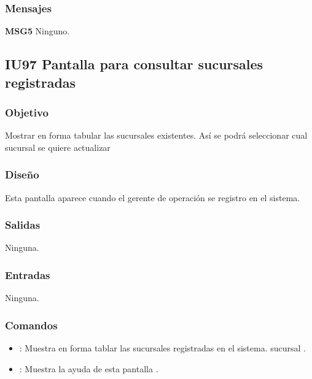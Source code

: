 \subsubsection{Mensajes}
	\begin{Citemize}
		\item {\bf MSG5} Ninguno.
	\end{Citemize}
	

\subsection{IU97 Pantalla para consultar sucursales registradas}

\subsubsection{Objetivo}
	Mostrar en forma tabular las sucursales existentes. Así se podrá seleccionar cual sucursal se quiere actualizar

\subsubsection{Diseño}
	Esta pantalla aparece cuando el gerente de operación se registro en el sistema.


\subsubsection{Salidas}

	Ninguna.

\subsubsection{Entradas}
	Ninguna.

\subsubsection{Comandos}
\begin{itemize}
	\item {}: Muestra en forma tablar las sucursales registradas en el sistema. sucursal .
	\item {}: Muestra la ayuda de esta pantalla .
\end{itemize}

